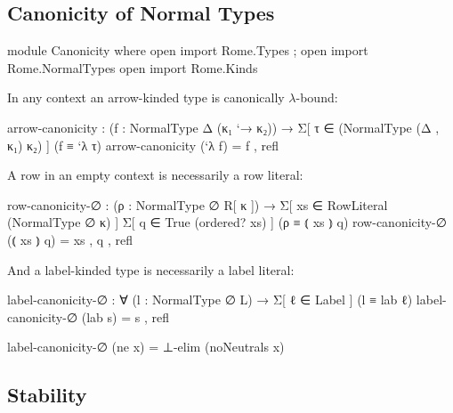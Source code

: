 \subsection{Canonicity of Normal Types}
\begin{AgdaAlign}
\begin{code}[hide]
module Canonicity where
  open import Rome.Types ; open import Rome.NormalTypes
  open import Rome.Kinds 
\end{code}
In any context an arrow-kinded type is canonically $\lambda$-bound:
\begin{code}
  arrow-canonicity : (f : NormalType Δ (κ₁ `→ κ₂)) → 
                     Σ[ τ ∈ (NormalType (Δ , κ₁) κ₂) ] 
                     (f ≡ `λ τ)
  arrow-canonicity (`λ f) = f , refl
\end{code}

\Ni A row in an empty context is necessarily a row literal:

\begin{code}
  row-canonicity-∅ : (ρ : NormalType ∅ R[ κ ]) → 
                    Σ[ xs ∈ RowLiteral (NormalType ∅ κ) ] 
                    Σ[ q ∈ True (ordered? xs) ] 
                    (ρ ≡ ⦅ xs ⦆ q)
  row-canonicity-∅ (⦅ xs ⦆ q) = xs , q , refl
\end{code}

\Ni And a label-kinded type is necessarily a label literal:

\begin{code}
  label-canonicity-∅ : ∀ (l : NormalType ∅ L) → 
                       Σ[ ℓ ∈ Label ] (l ≡ lab ℓ)
  label-canonicity-∅ (lab s) = s , refl
\end{code}
\begin{code}[hide]
  label-canonicity-∅ (ne x) = ⊥-elim (noNeutrals x)
\end{code}
\end{AgdaAlign}

\subsection{Stability}

